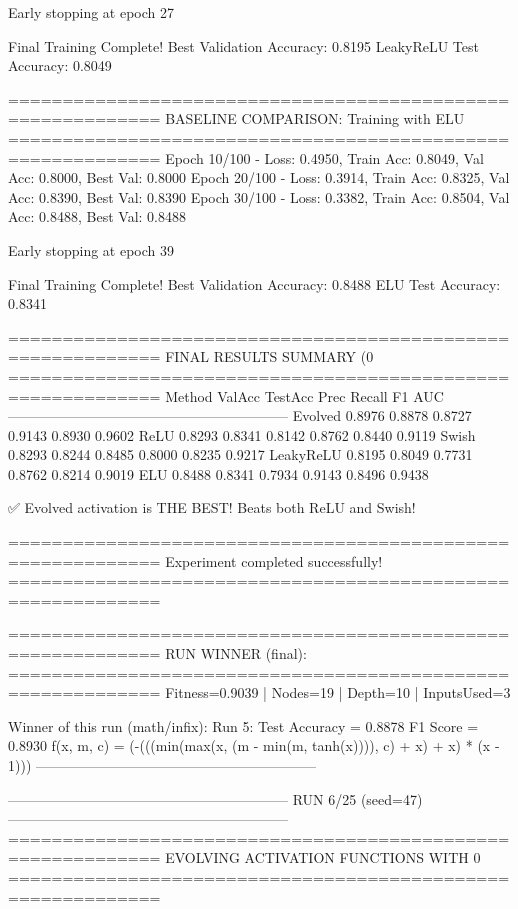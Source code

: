 Early stopping at epoch 27

Final Training Complete!
Best Validation Accuracy: 0.8195
LeakyReLU Test Accuracy: 0.8049

============================================================
BASELINE COMPARISON: Training with ELU
============================================================
Epoch  10/100 - Loss: 0.4950, Train Acc: 0.8049, Val Acc: 0.8000, Best Val: 0.8000
Epoch  20/100 - Loss: 0.3914, Train Acc: 0.8325, Val Acc: 0.8390, Best Val: 0.8390
Epoch  30/100 - Loss: 0.3382, Train Acc: 0.8504, Val Acc: 0.8488, Best Val: 0.8488

Early stopping at epoch 39

Final Training Complete!
Best Validation Accuracy: 0.8488
ELU Test Accuracy: 0.8341

============================================================
FINAL RESULTS SUMMARY (0%
============================================================
Method             ValAcc     TestAcc    Prec       Recall     F1         AUC
------------------------------------------------------------
Evolved            0.8976     0.8878     0.8727     0.9143     0.8930     0.9602
ReLU               0.8293     0.8341     0.8142     0.8762     0.8440     0.9119
Swish              0.8293     0.8244     0.8485     0.8000     0.8235     0.9217
LeakyReLU          0.8195     0.8049     0.7731     0.8762     0.8214     0.9019
ELU                0.8488     0.8341     0.7934     0.9143     0.8496     0.9438

✅ Evolved activation is THE BEST! Beats both ReLU and Swish!

============================================================
Experiment completed successfully!
============================================================

============================================================
RUN WINNER (final):
============================================================
Fitness=0.9039 | Nodes=19 | Depth=10 | InputsUsed=3

Winner of this run (math/infix):
  Run 5:
     Test Accuracy = 0.8878
     F1 Score      = 0.8930
     f(x, m, c)    = (-(((min(max(x, (m - min(m, tanh(x)))), c) + x) + x) * (x - 1)))
------------------------------------------------------------

------------------------------------------------------------
RUN 6/25 (seed=47)
------------------------------------------------------------
============================================================
EVOLVING ACTIVATION FUNCTIONS
WITH 0%
============================================================

